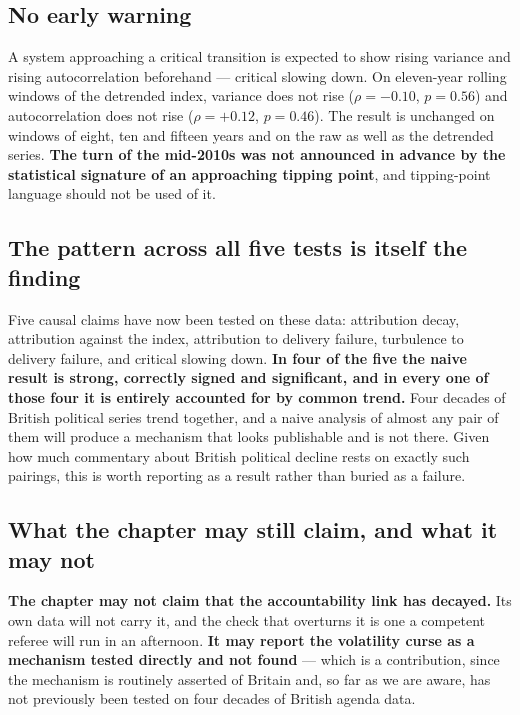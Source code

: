 \subsection*{No early warning}

A system approaching a critical transition is expected to show rising variance and rising
autocorrelation beforehand --- critical slowing down. On eleven-year rolling windows of the
detrended index, variance does not rise ($\rho=-0.10$, $p=0.56$) and autocorrelation does not rise
($\rho=+0.12$, $p=0.46$). The result is unchanged on windows of eight, ten and fifteen years and on
the raw as well as the detrended series. \textbf{The turn of the mid-2010s was not announced in
advance by the statistical signature of an approaching tipping point}, and tipping-point language
should not be used of it.

\subsection*{The pattern across all five tests is itself the finding}

Five causal claims have now been tested on these data: attribution decay, attribution against the
index, attribution to delivery failure, turbulence to delivery failure, and critical slowing down.
\textbf{In four of the five the naive result is strong, correctly signed and significant, and in
every one of those four it is entirely accounted for by common trend.} Four decades of British
political series trend together, and a naive analysis of almost any pair of them will produce a
mechanism that looks publishable and is not there. Given how much commentary about British political
decline rests on exactly such pairings, this is worth reporting as a result rather than buried as a
failure.

\subsection*{What the chapter may still claim, and what it may not}

\textbf{The chapter may not claim that the accountability link has decayed.} Its own data will not
carry it, and the check that overturns it is one a competent referee will run in an afternoon.
\textbf{It may report the volatility curse as a mechanism tested directly and not found} --- which
is a contribution, since the mechanism is routinely asserted of Britain and, so far as we are aware,
has not previously been tested on four decades of British agenda data.

